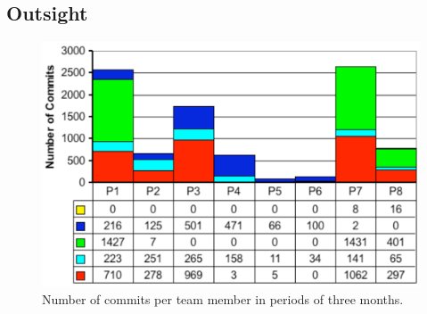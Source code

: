 \subsection{Outsight}\label{sec:outsight}
\begin{figure}[htbp]
\begin{center}
\includegraphics[width=0.8\columnwidth]{fig/chronia-commit-histogram}
\caption{Number of commits per team member in periods of three months.}
\label{fig:histogram}
\end{center}
\end{figure}

